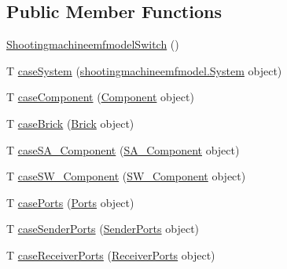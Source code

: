 \subsection*{Public Member Functions}
\begin{DoxyCompactItemize}
\item 
\hyperlink{classshootingmachineemfmodel_1_1util_1_1_shootingmachineemfmodel_switch_3_01_t_01_4_a93f1e3842f05e1d2dab76c5412922c3a}{Shootingmachineemfmodel\-Switch} ()
\item 
T \hyperlink{classshootingmachineemfmodel_1_1util_1_1_shootingmachineemfmodel_switch_3_01_t_01_4_ada7d61d249d04bc0a0b6b9906ce882a0}{case\-System} (\hyperlink{interfaceshootingmachineemfmodel_1_1_system}{shootingmachineemfmodel.\-System} object)
\item 
T \hyperlink{classshootingmachineemfmodel_1_1util_1_1_shootingmachineemfmodel_switch_3_01_t_01_4_adda7129877bec8ba8ee767d1f502690a}{case\-Component} (\hyperlink{interfaceshootingmachineemfmodel_1_1_component}{Component} object)
\item 
T \hyperlink{classshootingmachineemfmodel_1_1util_1_1_shootingmachineemfmodel_switch_3_01_t_01_4_a6e82b291459fea640908f4c8597993b6}{case\-Brick} (\hyperlink{interfaceshootingmachineemfmodel_1_1_brick}{Brick} object)
\item 
T \hyperlink{classshootingmachineemfmodel_1_1util_1_1_shootingmachineemfmodel_switch_3_01_t_01_4_a0f7f44e0c2dd457e411ca81e72af01c2}{case\-S\-A\-\_\-\-Component} (\hyperlink{interfaceshootingmachineemfmodel_1_1_s_a___component}{S\-A\-\_\-\-Component} object)
\item 
T \hyperlink{classshootingmachineemfmodel_1_1util_1_1_shootingmachineemfmodel_switch_3_01_t_01_4_a423e75ec54fc9d9a175d3a2e7e0b0037}{case\-S\-W\-\_\-\-Component} (\hyperlink{interfaceshootingmachineemfmodel_1_1_s_w___component}{S\-W\-\_\-\-Component} object)
\item 
T \hyperlink{classshootingmachineemfmodel_1_1util_1_1_shootingmachineemfmodel_switch_3_01_t_01_4_a89ee4a5f7b9abba57fd977af5e86e4b4}{case\-Ports} (\hyperlink{interfaceshootingmachineemfmodel_1_1_ports}{Ports} object)
\item 
T \hyperlink{classshootingmachineemfmodel_1_1util_1_1_shootingmachineemfmodel_switch_3_01_t_01_4_a67fc96f9ef69180ba39c558b55c9e8f0}{case\-Sender\-Ports} (\hyperlink{interfaceshootingmachineemfmodel_1_1_sender_ports}{Sender\-Ports} object)
\item 
T \hyperlink{classshootingmachineemfmodel_1_1util_1_1_shootingmachineemfmodel_switch_3_01_t_01_4_a665b488ce381f9cecd82a0a77bff67b7}{case\-Receiver\-Ports} (\hyperlink{interfaceshootingmachineemfmodel_1_1_receiver_ports}{Receiver\-Ports} object)

\end{DoxyCompactItemize}

